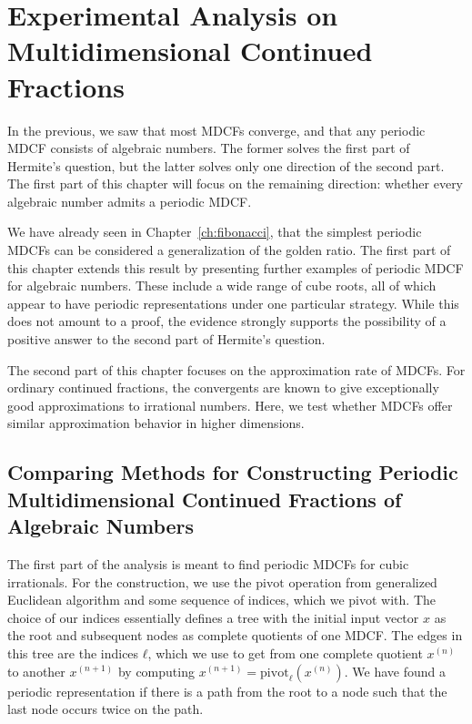 \chapter{Experimental Analysis on Multidimensional Continued Fractions}
\label{ch:implementation}

In the previous, we saw that most MDCFs converge,
and that any periodic MDCF consists of algebraic numbers.
The former solves the first part of Hermite's question, but the latter solves
only one direction of the second part.
The first part of this chapter will focus on the remaining direction:
whether every algebraic number admits a periodic MDCF.

We have already seen in Chapter~\ref{ch:fibonacci},
that the simplest periodic MDCFs can be considered a generalization of the
golden ratio.
The first part of this chapter extends this result by presenting further
examples of periodic MDCF for algebraic numbers.
These include a wide range of cube roots,
all of which appear to have periodic representations under one particular strategy.
While this does not amount to a proof, the evidence strongly supports
the possibility of a positive answer to the second part of Hermite’s question.

The second part of this chapter focuses on the approximation rate of MDCFs.
For ordinary continued fractions, the convergents are known to give
exceptionally good approximations to irrational numbers.
Here, we test whether MDCFs offer similar approximation behavior in higher dimensions.

\section{Comparing Methods for Constructing Periodic Multidimensional Continued Fractions of Algebraic Numbers}

The first part of the analysis is meant to find periodic MDCFs for cubic
irrationals.
For the construction, we use the $\mathrm{pivot}$ operation from generalized
Euclidean algorithm and some sequence of indices, which we pivot with.
The choice of our indices essentially defines a tree
with the initial input vector $x$ as the root
and subsequent nodes as complete quotients of one MDCF.
The edges in this tree are the indices $ℓ$, which we use to get from one
complete quotient $x^{(n)}$ to another $x^{(n+1)}$ by computing $x^{(n+1)} =
\mathrm{pivot}_ℓ(x^{(n)})$.
We have found a periodic representation if there is a path from the root to a
node such that the last node occurs twice on the path.


